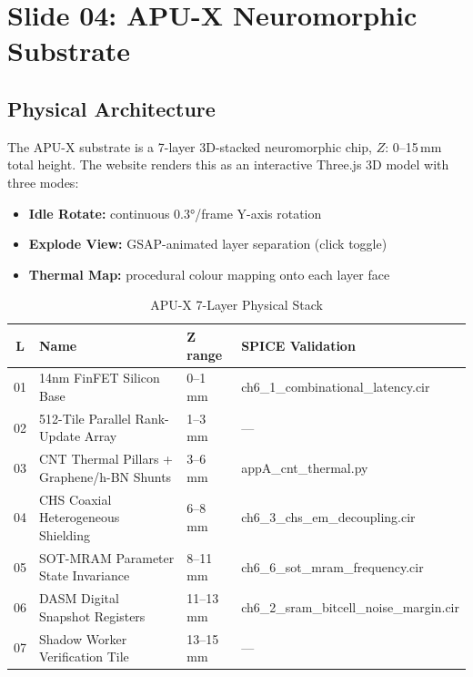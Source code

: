 \documentclass[12pt, a4paper]{article}
\begin{document}
\section{Slide 04: APU-X Neuromorphic Substrate}
\label{sec:apux}

\subsection{Physical Architecture}

The APU-X substrate is a 7-layer 3D-stacked neuromorphic chip, $Z$: 0--15\,mm total height.
The website renders this as an interactive Three.js 3D model with three modes:
\begin{itemize}[noitemsep]
  \item \textbf{Idle Rotate:} continuous 0.3°/frame Y-axis rotation
  \item \textbf{Explode View:} GSAP-animated layer separation (click toggle)
  \item \textbf{Thermal Map:} procedural colour mapping onto each layer face
\end{itemize}

\begin{table}[H]
  \centering
  \caption{APU-X 7-Layer Physical Stack}
  \small
  \begin{tabularx}{\textwidth}{c X l l}
    \toprule
    \textbf{L} & \textbf{Name} & \textbf{Z range} & \textbf{SPICE Validation} \\
    \midrule
    01 & 14nm FinFET Silicon Base & 0–1 mm & ch6\_1\_combinational\_latency.cir \\
    02 & 512-Tile Parallel Rank-Update Array & 1–3 mm & — \\
    03 & CNT Thermal Pillars + Graphene/h-BN Shunts & 3–6 mm & appA\_cnt\_thermal.py \\
    04 & CHS Coaxial Heterogeneous Shielding & 6–8 mm & ch6\_3\_chs\_em\_decoupling.cir \\
    05 & SOT-MRAM Parameter State Invariance & 8–11 mm & ch6\_6\_sot\_mram\_frequency.cir \\
    06 & DASM Digital Snapshot Registers & 11–13 mm & ch6\_2\_sram\_bitcell\_noise\_margin.cir \\
    07 & Shadow Worker Verification Tile & 13–15 mm & — \\
    \bottomrule
  \end{tabularx}
\end{table}
\end{document}
